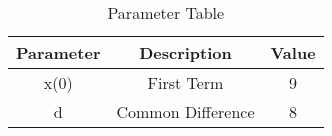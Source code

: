 
\begin{table}[ht]
  \centering
  \begin{tabular}{|c||c||c|}
    \hline
    Parameter & Description & Value \\
    \hline
     x(0) & First Term & 9\\
     \hline
     d & Common Difference & 8\\
    \hline
  \end{tabular}
  \vspace{2mm}
  \caption{Parameter Table}
\end{table}
